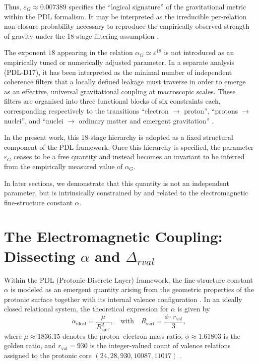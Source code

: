 \documentclass[11pt,a4paper]{article}
\begin{document}
Thus, $\varepsilon_G \approx 0.007389$ specifies the “logical signature” of the gravitational metric within the PDL formalism. It may be interpreted as the irreducible per-relation non-closure probability necessary to reproduce the empirically observed strength of gravity under the 18-stage filtering assumption \cite{Exponent_18_PDL_2026}.

The exponent \(18\) appearing in the relation \(\alpha_G \simeq \varepsilon^{18}\) is not introduced as an empirically tuned or numerically adjusted parameter. In a separate analysis (PDL-D17), it has been interpreted as the minimal number of independent coherence filters that a locally defined leakage must traverse in order to emerge as an effective, universal gravitational coupling at macroscopic scales. These filters are organised into three functional blocks of six constraints each, corresponding respectively to the transitions “electron \(\rightarrow\) proton”, “protons \(\rightarrow\) nuclei”, and “nuclei \(\rightarrow\) ordinary matter and emergent gravitation” \cite{Exponent_18_PDL_2026}. 

In the present work, this 18-stage hierarchy is adopted as a fixed structural component of the PDL framework. Once this hierarchy is specified, the parameter \(\varepsilon_G\) ceases to be a free quantity and instead becomes an invariant to be inferred from the empirically measured value of \(\alpha_G\).

In later sections, we demonstrate that this quantity is not an independent parameter, but is intrinsically constrained by and related to the electromagnetic fine-structure constant \(\alpha\).

\section{The Electromagnetic Coupling: Dissecting \texorpdfstring{$\alpha$}{alpha} and \texorpdfstring{$\Delta_{rval}$}{Delta	extunderscore rval}}

Within the PDL (Protonic Discrete Layer) framework, the fine-structure constant $\alpha$ is modeled as an emergent quantity arising from the geometric properties of the protonic surface together with its internal valence configuration \cite{Combinatorial_Proton_v2_2026, PDL_Global_Mapping_2026}. In an ideally closed relational system, the theoretical expression for $\alpha$ is given by
\begin{equation}
    \alpha_{\text{ideal}} = \frac{\mu}{R_{\text{surf}}^2}, 
    \quad \text{with} \quad 
    R_{\text{surf}} = \frac{\phi \cdot r_{\text{val}}}{3},
\end{equation}
where $\mu \approx 1836.15$ denotes the proton–electron mass ratio, $\phi \approx 1.61803$ is the golden ratio, and $r_{\text{val}} = 930$ is the integer-valued count of valence relations assigned to the protonic core $(24, 28, 930, 10087, 11017)$ \cite{PDL_Main_2026, Combinatorial_Proton_v2_2026}.
\end{document}
